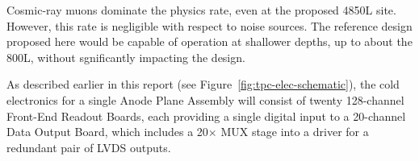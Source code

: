 Cosmic-ray muons dominate the physics rate, even at the proposed 4850L site.  
However, this rate is negligible with respect to noise sources.  The
reference design proposed here would be capable of operation at
shallower depths, up to about the 800L, without sgnificantly impacting
the design.

 As described earlier in this report
(see Figure~\ref{fig:tpc-elec-schematic}), 
the cold electronics for a single Anode Plane Assembly 
will consist of twenty 128-channel Front-End Readout 
Boards, each providing a single digital input to a 20-channel
Data Output Board, which includes a 20$\times$ MUX stage into a  
driver for a redundant pair of LVDS outputs.   

